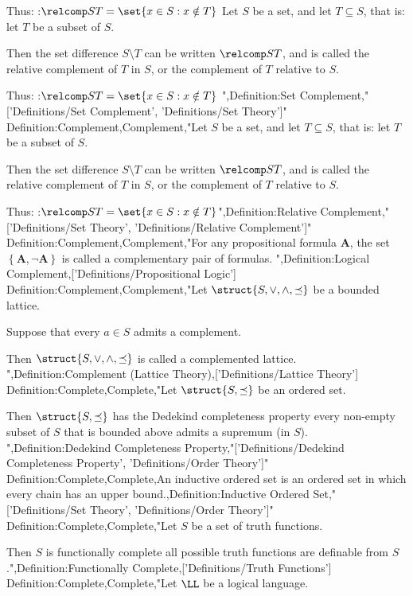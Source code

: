 Thus:
:$\relcomp S T = \set {x \in S : x \notin T}$
Let $S$ be a set, and let $T \subseteq S$, that is: let $T$ be a subset of $S$.

Then the set difference $S \setminus T$ can be written $\relcomp S T$, and is called the relative complement of $T$ in $S$, or the complement of $T$ relative to $S$.

Thus:
:$\relcomp S T = \set {x \in S : x \notin T}$
",Definition:Set Complement,"['Definitions/Set Complement', 'Definitions/Set Theory']"
Definition:Complement,Complement,"Let $S$ be a set, and let $T \subseteq S$, that is: let $T$ be a subset of $S$.

Then the set difference $S \setminus T$ can be written $\relcomp S T$, and is called the relative complement of $T$ in $S$, or the complement of $T$ relative to $S$.

Thus:
:$\relcomp S T = \set {x \in S : x \notin T}$",Definition:Relative Complement,"['Definitions/Set Theory', 'Definitions/Relative Complement']"
Definition:Complement,Complement,"For any propositional formula $\mathbf A$, the set $\left\{{\mathbf A, \neg \mathbf A}\right\}$ is called a complementary pair of formulas.
",Definition:Logical Complement,['Definitions/Propositional Logic']
Definition:Complement,Complement,"Let $\struct {S, \vee, \wedge, \preceq}$ be a bounded lattice.

Suppose that every $a \in S$ admits a complement.


Then $\struct {S, \vee, \wedge, \preceq}$ is called a complemented lattice.
",Definition:Complement (Lattice Theory),['Definitions/Lattice Theory']
Definition:Complete,Complete,"Let $\struct {S, \preceq}$ be an ordered set.

Then $\struct {S, \preceq}$ has the Dedekind completeness property  every non-empty subset of $S$ that is bounded above admits a supremum (in $S$).
",Definition:Dedekind Completeness Property,"['Definitions/Dedekind Completeness Property', 'Definitions/Order Theory']"
Definition:Complete,Complete,An inductive ordered set is an ordered set in which every chain has an upper bound.,Definition:Inductive Ordered Set,"['Definitions/Set Theory', 'Definitions/Order Theory']"
Definition:Complete,Complete,"Let $S$ be a set of truth functions.


Then $S$ is functionally complete  all possible truth functions are definable from $S$.",Definition:Functionally Complete,['Definitions/Truth Functions']
Definition:Complete,Complete,"Let $\LL$ be a logical language.

